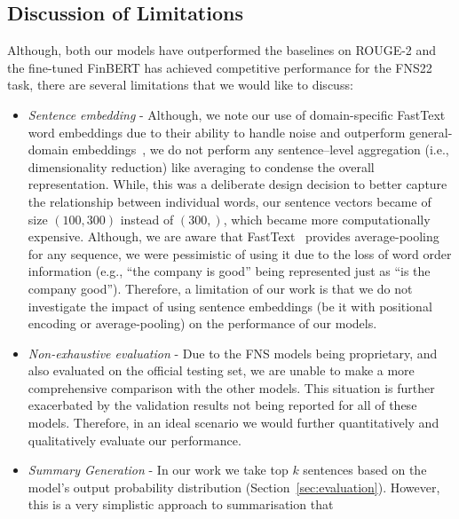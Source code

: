 \subsection{Discussion of Limitations}\label{subsec:limitations}
Although, both our models have outperformed the baselines on ROUGE-2 and the fine-tuned FinBERT has achieved competitive
performance for the FNS22 task, there are several limitations that we would like to discuss:
\begin{itemize}
    \item \emph{Sentence embedding} - Although, we note our use of domain-specific FastText word embeddings due to their
    ability to handle noise and outperform general-domain embeddings~\cite{rahimikia2021realised}, we do not perform
    any sentence--level aggregation (i.e., dimensionality reduction) like averaging to condense the overall representation.
    While, this was a deliberate design decision to better capture the relationship between individual words,
    our sentence vectors became of size $(100, 300)$ instead of $(300,)$, which became more computationally expensive.
    Although, we are aware that FastText~\cite{bojanowski-etal-2017-enriching} provides average-pooling for any sequence,
    we were pessimistic of using it due to the loss of word order information (e.g., ``the company is good'' being represented just as ``is the company good'').
    Therefore, a limitation of our work is that we do not investigate the impact of using sentence embeddings
    (be it with positional encoding or average-pooling) on the performance of our models.
    \item \emph{Non-exhaustive evaluation} - Due to the FNS models being proprietary, and also evaluated on the official testing set,
    we are unable to make a more comprehensive comparison with the other models.
    This situation is further exacerbated by the validation results not being reported for all of these models.
    Therefore, in an ideal scenario we would further quantitatively and qualitatively evaluate our performance.
    \item \emph{Summary Generation} - In our work we take top $k$ sentences based on the model's output probability distribution (Section~\ref{sec:evaluation}).
        However, this is a very simplistic approach to summarisation that
\end{itemize}

